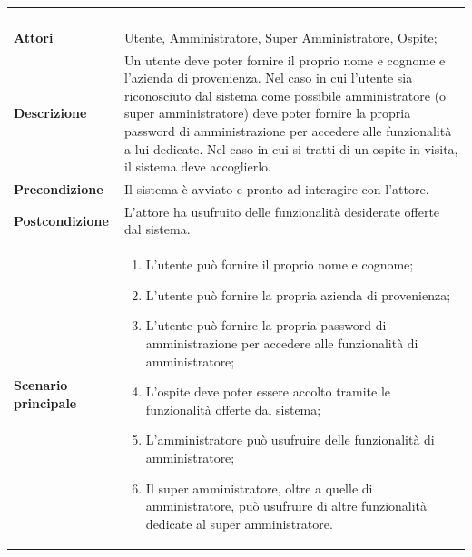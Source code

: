 \begin{longtable}{l|p{10cm}}
\rowcolor[gray]{0.8} \multicolumn{2}{c}{} \\
\rowcolor[gray]{0.8} \multicolumn{2}{c}{\textbf{UC0 - Funzionalità sistema}} \\
\rowcolor[gray]{0.8} \multicolumn{2}{c}{} \\
\hline
&\\
\textbf{Attori} & Utente, Amministratore, Super Amministratore, Ospite;\\[7pt]
\textbf{Descrizione} & Un utente deve poter fornire il proprio nome e cognome e l'azienda di provenienza. Nel caso in cui l'utente sia riconosciuto dal sistema come possibile amministratore (o super amministratore) deve poter fornire la propria password di amministrazione per accedere alle funzionalità a lui dedicate. Nel caso in cui si tratti di un ospite in visita, il sistema deve accoglierlo.\\[7pt]
\textbf{Precondizione} & Il sistema è avviato e pronto ad interagire con l'attore.\\[7pt]
\textbf{Postcondizione} & L'attore ha usufruito delle funzionalità desiderate offerte dal sistema. \\[7pt]
\textbf{Scenario principale} &
\begin{enumerate}
 \item L'utente può fornire il proprio nome e cognome;
 \item L'utente può fornire la propria azienda di provenienza;
 \item L'utente può fornire la propria password di amministrazione per accedere alle funzionalità di amministratore;
 \item L'ospite deve poter essere accolto tramite le funzionalità offerte dal sistema;
 \item L'amministratore può usufruire delle funzionalità di amministratore;
 \item Il super amministratore, oltre a quelle di amministratore, può usufruire di altre funzionalità dedicate al super amministratore.
\end{enumerate}
\\[7pt]\hline
\end{longtable}
 